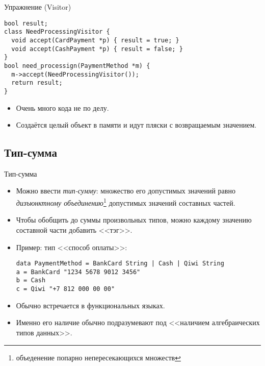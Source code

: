 \begin{frame}[fragile]{Упражнение (Visitor)}
\begin{verbatim}
bool result;
class NeedProcessingVisitor {
  void accept(CardPayment *p) { result = true; }
  void accept(CashPayment *p) { result = false; }
}
bool need_processign(PaymentMethod *m) {
  m->accept(NeedProcessingVisitor());
  return result;
}
\end{verbatim}
	\begin{itemize}
		\item Очень много кода не по делу.
		\item Создаётся целый объект в памяти и идут пляски с возвращаемым значением.
	\end{itemize}
\end{frame}

\subsection{Тип-сумма}
\begin{frame}[fragile]{Тип-сумма}
	\begin{itemize}
		\item Можно ввести \textit{тип-сумму}: множество его допустимых значений равно \textit{дизъюнктному объединению}\footnote{объеденение попарно непересекающихся множеств} допустимых значений составных частей.
		\item Чтобы обобщить до суммы произвольных типов, можно каждому значению составной части добавить <<тэг>>.
		\item Пример: тип <<способ оплаты>>:
\begin{verbatim}
data PaymentMethod = BankCard String | Cash | Qiwi String
a = BankCard "1234 5678 9012 3456"
b = Cash
c = Qiwi "+7 812 000 00 00"
\end{verbatim}
		\item Обычно встречается в функциональных языках.
		\item Именно его наличие обычно подразумевают под <<наличием алгебраических типов данных>>.
	\end{itemize}
\end{frame}

